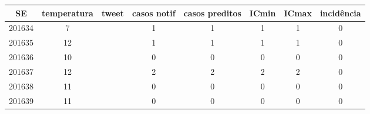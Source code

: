 \begin{tabular}{c|ccccccc}
  \hline
SE & temperatura & tweet & casos notif & casos preditos & ICmin & ICmax & incidência \\ 
  \hline
201634 & 7 &  & 1 & 1 & 1 & 1 & 0 \\ 
  201635 & 12 &  & 1 & 1 & 1 & 1 & 0 \\ 
  201636 & 10 &  & 0 & 0 & 0 & 0 & 0 \\ 
  201637 & 12 &  & 2 & 2 & 2 & 2 & 0 \\ 
  201638 & 11 &  & 0 & 0 & 0 & 0 & 0 \\ 
  201639 & 11 &  & 0 & 0 & 0 & 0 & 0 \\ 
   \hline
\end{tabular}
